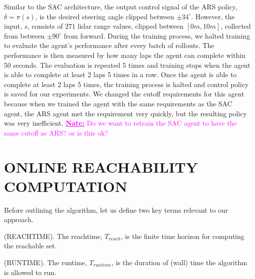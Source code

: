 \documentclass[manuscript,screen,review]{acmart}
\newcommand{\nate}[1]{\textcolor{magenta}{\textbf{\underline{Nate:}} #1}}
\begin{document}
Similar to the SAC architecture, the output control signal of the ARS policy, $\delta = \pi(s)$, is the desired steering angle clipped between $\pm34^{\circ}$. However, the input, $s$, consists of $271$ lidar range values, clipped between $[0m, 10m]$, collected from between $\pm90^{\circ}$ from forward. During the training process, we halted training to evaluate the agent's performance after every batch of rollouts. The performance is then measured by how many laps the agent can complete within 50 seconds. The evaluation is repeated 5 times and training stops when the agent is able to complete at least 2 laps 5 times in a row. Once the agent is able to complete at least 2 laps 5 times, the training process is halted and control policy is saved for our experiments. We changed the cutoff requirements for this agent because when we trained the agent with the same requirements as the SAC agent, the ARS agent met the requirement very quickly, but the resulting policy was very inefficient. \nate{Do we want to retrain the SAC agent to have the same cutoff as ARS? or is this ok?}



\section{ONLINE REACHABILITY COMPUTATION}

Before outlining the algorithm, let us define two key terms relevant to our approach.\smallskip

\begin{definition}%
(REACHTIME). The reachtime, $T_{reach}$, is the finite time horizon for computing the reachable set.
\end{definition}%
\begin{definition}%
(RUNTIME). The runtime, $T_{runtime}$, is the duration of (wall) time the algorithm is allowed to run.
\end{definition}%
\end{document}
